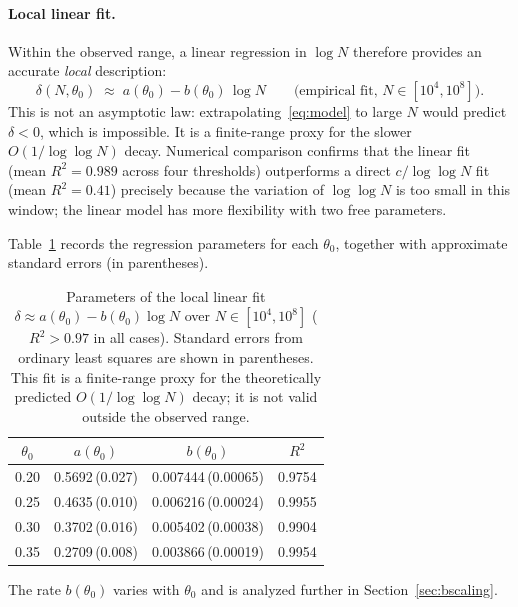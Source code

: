 \documentclass[11pt]{article}
\theoremstyle{definition}
\begin{document}
\paragraph{Local linear fit.}
Within the observed range, a linear regression in \(\log N\) therefore provides an
accurate \emph{local} description:
\begin{equation}\label{eq:model}
  \delta(N,\theta_0) \;\approx\; a(\theta_0) - b(\theta_0)\,\log N
  \qquad \text{(empirical fit, } N \in [10^4, 10^8]\text{)}.
\end{equation}
This is not an asymptotic law: extrapolating~\eqref{eq:model} to large \(N\) would
predict \(\delta < 0\), which is impossible.  It is a finite-range proxy for the
slower \(O(1/\!\log\log N)\) decay.  Numerical comparison confirms that the linear fit
(mean \(R^2 = 0.989\) across four thresholds) outperforms a direct \(c/\!\log\log N\)
fit (mean \(R^2 = 0.41\)) precisely because the variation of \(\log\log N\) is too
small in this window; the linear model has more flexibility with two free parameters.

Table~\ref{tab:fit} records the regression parameters for each \(\theta_0\), together
with approximate standard errors (in parentheses).

\begin{table}[ht]
\centering
\caption{Parameters of the local linear fit
  \(\delta \approx a(\theta_0) - b(\theta_0)\log N\) over \(N \in [10^4, 10^8]\)
  (\(R^2 > 0.97\) in all cases).  Standard errors from ordinary least squares are
  shown in parentheses.  This fit is a finite-range proxy for the theoretically
  predicted \(O(1/\!\log\log N)\) decay; it is not valid outside the observed range.}
\label{tab:fit}
\begin{tabular}{cccc}
\toprule
\(\theta_0\) & \(a(\theta_0)\) & \(b(\theta_0)\) & \(R^2\) \\
\midrule
0.20 & 0.5692\,(0.027) & 0.007444\,(0.00065) & 0.9754 \\
0.25 & 0.4635\,(0.010) & 0.006216\,(0.00024) & 0.9955 \\
0.30 & 0.3702\,(0.016) & 0.005402\,(0.00038) & 0.9904 \\
0.35 & 0.2709\,(0.008) & 0.003866\,(0.00019) & 0.9954 \\
\bottomrule
\end{tabular}
\end{table}

The rate \(b(\theta_0)\) varies with \(\theta_0\) and is analyzed further in
Section~\ref{sec:bscaling}.
\end{document}
